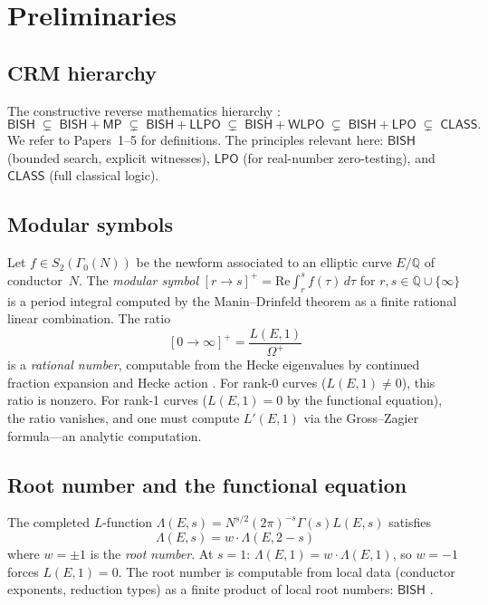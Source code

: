 \documentclass[11pt]{article}
\theoremstyle{plain}
\theoremstyle{definition}
\theoremstyle{remark}
\newcommand{\Q}{\mathbb{Q}}
\newcommand{\BISH}{\ensuremath{\mathsf{BISH}}}
\newcommand{\LPO}{\ensuremath{\mathsf{LPO}}}
\newcommand{\WLPO}{\ensuremath{\mathsf{WLPO}}}
\newcommand{\LLPO}{\ensuremath{\mathsf{LLPO}}}
\newcommand{\MP}{\ensuremath{\mathsf{MP}}}
\newcommand{\CLASS}{\ensuremath{\mathsf{CLASS}}}
\begin{document}
\section{Preliminaries}
\label{sec:prelim}

\subsection{CRM hierarchy}

The constructive reverse mathematics hierarchy \cite{bridges-richman,paper1,paper40}:
\[
\BISH \;\subsetneq\; \BISH{+}\MP \;\subsetneq\; \BISH{+}\LLPO \;\subsetneq\; \BISH{+}\WLPO \;\subsetneq\; \BISH{+}\LPO \;\subsetneq\; \CLASS.
\]
We refer to Papers~1--5 for definitions. The principles relevant here: $\BISH$ (bounded search, explicit witnesses), $\LPO$ (for real-number zero-testing), and $\CLASS$ (full classical logic).

\subsection{Modular symbols}

Let $f \in S_2(\Gamma_0(N))$ be the newform associated to an elliptic curve $E/\Q$ of conductor~$N$. The \emph{modular symbol} $[r \to s]^+ = \mathrm{Re}\int_r^s f(\tau)\,d\tau$ for $r, s \in \Q \cup \{\infty\}$ is a period integral computed by the Manin--Drinfeld theorem \cite{manin} as a finite rational linear combination. The ratio
\[
[0 \to \infty]^+ = \frac{L(E,1)}{\Omega^+}
\]
is a \emph{rational number}, computable from the Hecke eigenvalues by continued fraction expansion and Hecke action \cite{cremona}. For rank-0 curves ($L(E,1) \neq 0$), this ratio is nonzero. For rank-1 curves ($L(E,1) = 0$ by the functional equation), the ratio vanishes, and one must compute $L'(E,1)$ via the Gross--Zagier formula---an analytic computation.

\subsection{Root number and the functional equation}

The completed $L$-function $\Lambda(E,s) = N^{s/2}(2\pi)^{-s}\Gamma(s)L(E,s)$ satisfies
\[
\Lambda(E, s) = w \cdot \Lambda(E, 2-s)
\]
where $w = \pm 1$ is the \emph{root number}. At $s = 1$: $\Lambda(E,1) = w \cdot \Lambda(E,1)$, so $w = -1$ forces $L(E,1) = 0$. The root number is computable from local data (conductor exponents, reduction types) as a finite product of local root numbers: $\BISH$ \cite{silverman-aec}.
\end{document}
